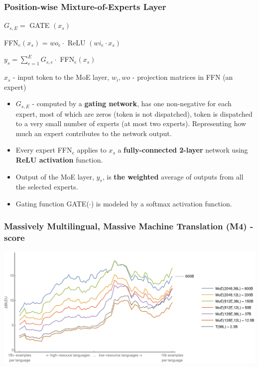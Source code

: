 \documentclass{beamer}
\begin{document}
\begin{frame}
    \frametitle{Position-wise Mixture-of-Experts Layer}
    \begin{center}
    $ G_{s,E} = $ GATE $(x_{s})$

    FFN$_{e}(x_{s})$ = $wo_{e} \cdot $ ReLU $(wi_{e} \cdot x_{s})$

    $y_{s} = \sum^{E}_{e=1} G_{s,e} \cdot $ FFN$_{e}(x_{s})$

    \tiny{$x_{s} $ - input token to the MoE layer, $w_{i}, w{o}$ - projection matrices in FFN (an expert)}
    \end{center}
    \begin{itemize}
        \item \footnotesize{$G_{s,E}$ - computed by a \textbf{gating network}, has one non-negative for each expert, most of which are zeros (token is not dispatched), token is dispatched to a very small number of experts (at most two experts). Representing how much an expert contributes to the network output.}
        \item \footnotesize{Every expert FFN$_{e}$ applies to $x_{s}$ a \textbf{fully-connected 2-layer} network using \textbf{ReLU activation} function.}
        \item \footnotesize{Output of the MoE layer, $y_{s}$, is \textbf{the weighted} average of outputs from all the selected experts.}
        \item \footnotesize{Gating function GATE($\cdot$) is modeled by a softmax activation function.}
    \end{itemize}
\end{frame}

\begin{frame}
    \frametitle{Massively Multilingual, Massive Machine Translation (M4) - score}
    \begin{center}
        \includegraphics[scale=0.3]{img/gshard_diagram.png}
    \end{center}
\end{frame}
\end{document}
